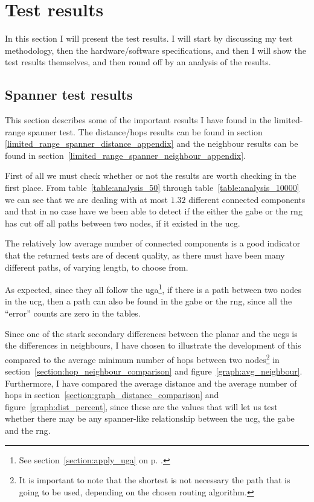 \section{Test results}
\label{section:test_results}
In this section I will present the test results. I will start by discussing my test methodology, then the hardware/software specifications, and then I will show the test results themselves, and then round off by an analysis of the results.

\subsection{Spanner test results}
This section describes some of the important results I have found in the limited-range spanner test. The distance/hops results can be found in section \ref{limited_range_spanner_distance_appendix} and the neighbour results can be found in section~\ref{limited_range_spanner_neighbour_appendix}.

First of all we must check whether or not the results are worth checking in the first place. From table~\ref{table:analysis_50} through table~\ref{table:analysis_10000} we can see that we are dealing with at most $1.32$ different connected components and that in no case have we been able to detect if the either the \ac{gabe} or the \ac{rng} has cut off all paths between two nodes, if it existed in the \ac{ucg}. 

The relatively low average number of connected components is a good indicator that the returned tests are of decent quality, as there must have been many different paths, of varying length, to choose from.

As expected, since they all follow the \ac{uga}\footnote{See section~\ref{section:apply_uga} on p. \pageref{section:apply_uga}.}, if there is a path between two nodes in the \ac{ucg}, then a path can also be found in the \ac{gabe} or the \ac{rng}, since all the ``error'' counts are zero in the tables.

Since one of the stark secondary differences between the planar and the \acp{ucg} is the differences in neighbours, I have chosen to illustrate the development of this compared to the average minimum number of hops between two nodes\footnote{It is important to note that the shortest is not necessary the path that is going to be used, depending on the chosen routing algorithm.} in section~\ref{section:hop_neighbour_comparison} and figure~\ref{graph:avg_neighbour}. Furthermore, I have compared the average distance and the average number of hops in section~\ref{section:graph_distance_comparison} and figure~\ref{graph:dist_percent}, since these are the values that will let us test whether there may be any spanner-like relationship between the \ac{ucg}, the \ac{gabe} and the \ac{rng}.

